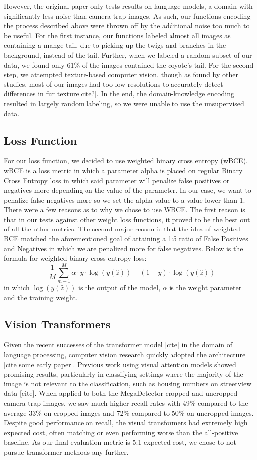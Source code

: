 \documentclass{article}
\begin{document}
However, the original paper only tests results on language models, a domain with significantly less noise than camera trap images. As such, our functions encoding the process described above were thrown off by the additional noise too much to be useful. For the first instance, our functions labeled almost all images as containing a mange-tail, due to picking up the twigs and branches in the background, instead of the tail. Further, when we labeled a random subset of our data, we found only 61\% of the images contained the coyote’s tail. For the second step, we attempted texture-based computer vision, though as found by other studies, most of our images had too low resolutions to accurately detect differences in fur texture[cite?]. In the end, the domain-knowledge encoding resulted in largely random labeling, so we were unable to use the unsupervised data.

\subsection{Loss Function}

For our loss function, we decided to use weighted binary cross entropy (wBCE).
wBCE is a loss metric in which a parameter alpha is placed on  regular Binary
Cross Entropy loss in which said parameter will penalize false positives or
negatives more depending on the value of the parameter. In our case, we want to
penalize false negatives more so we set the alpha value to a value lower than 1.
There were a few reasons as to why we chose to use WBCE. The first reason is
that in our tests against other weight loss functions, it proved to be the best
out of all the other metrics. The second major reason is that the idea of
weighted BCE matched the aforementioned goal of attaining a 1:5 ratio of False
Positives and Negatives in which we are penalized more for false negatives.
Below is the formula for weighted binary cross entropy loss:
\[
-\frac{1}{M}\sum_{m-1}^{M}\alpha \cdot y \cdot \log(y(\hat{z}))-(1-y)\cdot\log(y(\hat{z}))
\]
in which $\log(y(\hat{z}))$ is the output of the model, $\alpha$ is the weight
parameter and the training weight.


\subsection{Vision Transformers}
Given the recent successes of the transformer model [cite] in the domain of language processing, computer vision research quickly adopted the architecture [cite some early paper].  Previous work using visual attention models showed promising results, particularly in classifying settings where the majority of the image is not relevant to the classification, such as housing numbers on streetview data [cite]. When applied to both the MegaDetector-cropped and uncropped camera trap images, we saw much higher recall rates with 49\% compared to the average 33\% on cropped images and 72\% compared to 50\% on uncropped images. Despite good performance on recall, the visual transformers had extremely high expected cost, often matching or even performing worse than the all-positive baseline. As our final evaluation metric is 5:1 expected cost, we chose to not pursue transformer methods any further.
\end{document}
